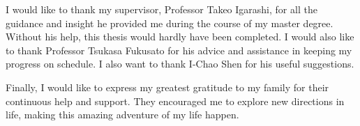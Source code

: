 I would like to thank my supervisor, Professor Takeo Igarashi, for all the guidance and insight he provided me during the course of my master degree. Without his help, this thesis would hardly have been completed. I would also like to thank Professor Tsukasa Fukusato for his advice and assistance in keeping my progress on schedule. I also want to thank I-Chao Shen for his useful suggestions.   


Finally, I would like to express my greatest gratitude to my family for their continuous help and support. They encouraged me to explore new directions in life, making this amazing adventure of my life happen.